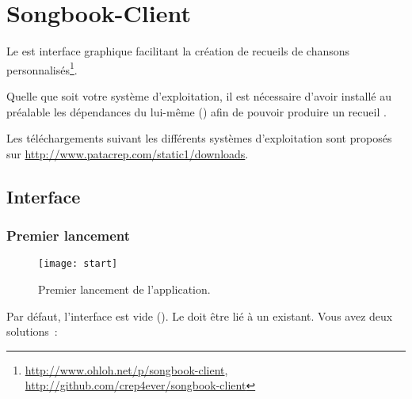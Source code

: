 \chapter{Songbook-Client}
\setcounter{chapter}{2}
\label{chap:songbook-client}
\minitoc

Le \client{} est interface graphique facilitant la création de
recueils de chansons
personnalisés\footnote{\url{http://www.ohloh.net/p/songbook-client},
  \url{http://github.com/crep4ever/songbook-client}}.

\begin{nota}
Quelle que soit votre système d'exploitation, il est nécessaire d'avoir installé
au préalable les dépendances du \recueil{} lui-même
() afin de pouvoir produire un recueil .
\end{nota}

Les téléchargements suivant les différents systèmes d'exploitation
sont proposés sur \url{http://www.patacrep.com/static1/downloads}.


\section{Interface}

\subsection{Premier lancement}

\begin{figure}
  \centering
  \texttt{[image: start]}
  \caption{Premier lancement de l'application.}
  \label{fig:start}
\end{figure}

Par défaut, l'interface est vide (). Le
\client{} doit être lié à un \recueil{} existant. Vous avez
deux solutions~:


